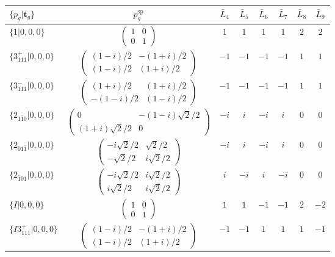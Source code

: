 \documentclass[3p,preprint]{elsarticle}
\newcommand{\bt}{\bm{t}}
\begin{document}
\begin{table}[H]
	\begin{tabular}{|l|c||c|c|c|c|c|c|} \hline
		$\{p_g|\bt_g\}$ & $p_g^{\text{sp}}$ & $\bar{L}_4$ & $\bar{L}_5$ & $\bar{L}_6$ & $\bar{L}_7$ & $\bar{L}_{8}$ & $\bar{L}_{9}$  \\ \hline \hline
		$\{1|0,0,0\}$ & 				$\left(\begin{array}{cc} 1&0 \\ 0&1 \end{array}\right)$ & $1$ &  $1$ &  $1$ &  $1$ &  $2$ &  $2$ \\ \hline
		$\{3^{+}_{111}|0,0,0\}$ &		$\left(\begin{array}{cc} (1-i)/2&-(1+i)/2 \\ (1-i)/2&(1+i)/2 \end{array}\right)$	&$-1$ & $-1$ & $-1$ & $-1$ & $1$ & $1$ \\ \hline
		$\{3^{-}_{111}|0,0,0\}$ &		$\left(\begin{array}{cc} (1+i)/2&(1+i)/2 \\ -(1-i)/2&(1-i)/2 \end{array}\right)$	&$-1$ & $-1$ & $-1$ & $-1$ & $1$ & $1$ \\ \hline
		$\{2_{1\bar{1}0}|0,0,0\}$ &	$\left(\begin{array}{cc} 0&-(1-i)\sqrt{2}/2 \\ (1+i)\sqrt{2}/2&0 \end{array}\right)$	&$-i$ & $i$ & $-i$ & $i$ & $0$ & $0$ \\ \hline
		$\{2_{01\bar{1}}|0,0,0\}$ &	$\left(\begin{array}{cc} -i\sqrt{2}/2&\sqrt{2}/2 \\ -\sqrt{2}/2&i\sqrt{2}/2 \end{array}\right)$	&$-i$ & $i$ & $-i$ & $i$ & $0$ & $0$ \\ \hline
		$\{2_{\bar{1}01}|0,0,0\}$ &	$\left(\begin{array}{cc} -i\sqrt{2}/2&i\sqrt{2}/2 \\ i\sqrt{2}/2&i\sqrt{2}/2 \end{array}\right)$	&$i$ & $-i$ & $i$ & $-i$ & $0$ & $0$ \\ \hline
		$\{I|0,0,0\}$ & 				 	$\left(\begin{array}{cc} 1&0 \\ 0&1 \end{array}\right)$ &$1$ &  $1$ &  $-1$ &  $-1$ &  $2$ &  $-2$ \\ \hline
		$\{I3^{+}_{111}|0,0,0\}$ &	$\left(\begin{array}{cc} (1-i)/2&-(1+i)/2 \\ (1-i)/2&(1+i)/2 \end{array}\right)$	&$-1$ & $-1$ & $1$ & $1$ & $1$ & $-1$ \\ \hline

\end{tabular}
\end{table}
\end{document}
